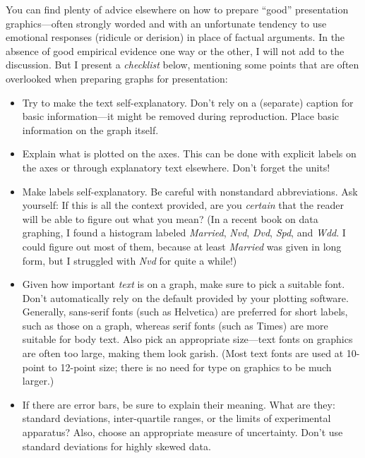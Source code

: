 You can find plenty of advice elsewhere on how to prepare ``good''
presentation graphics---often strongly worded and   with an
unfortunate tendency to use emotional responses (ridicule or derision)
in place of factual arguments.  In the absence of good empirical
evidence one way or the other, I will not add to the discussion. But I
present a \emph{checklist} below, mentioning some points that are
often overlooked when preparing graphs for presentation:
\begin{itemize}
\item Try to make the text self-explanatory. Don't rely on a (separate)
  caption for basic information---it might be removed during 
  reproduction. Place basic information on the graph itself.

\item Explain what is plotted on the axes. This can be done with 
  explicit labels on the axes or through explanatory text elsewhere.
  Don't forget the units!

\item Make labels self-explanatory. Be careful with nonstandard
  abbreviations. Ask yourself: If this is all the context provided,
  are you \emph{certain} that the reader will be able to figure out
  what you mean? (In a recent book on data graphing, I found a
  histogram labeled \emph{Married}, \emph{Nvd}, \emph{Dvd},
  \emph{Spd}, and \emph{Wdd}. I could figure out most of them, because
  at least \emph{Married} was given in long form, but I struggled with
  \emph{Nvd} for quite a while!)

\item Given how important \emph{text} is on a graph, make sure to pick
  a suitable font. Don't automatically rely on the default provided by
  your plotting software. Generally, sans-serif fonts (such as
  Helvetica) are preferred for short labels, such as those on a graph,
  whereas serif fonts (such as Times) are more suitable for body text.
  Also pick an appropriate size---text fonts on graphics are often too
  large, making them look garish. (Most text fonts are used at
  10-point to 12-point size; there is no need for type on graphics to
  be much larger.)

\item If there are error bars, be sure to explain their meaning. What
  are they: standard deviations, inter-quartile ranges, or the limits
  of experimental apparatus? Also, choose an appropriate measure of
  uncertainty. Don't use standard deviations for highly skewed data.


\end{itemize}
